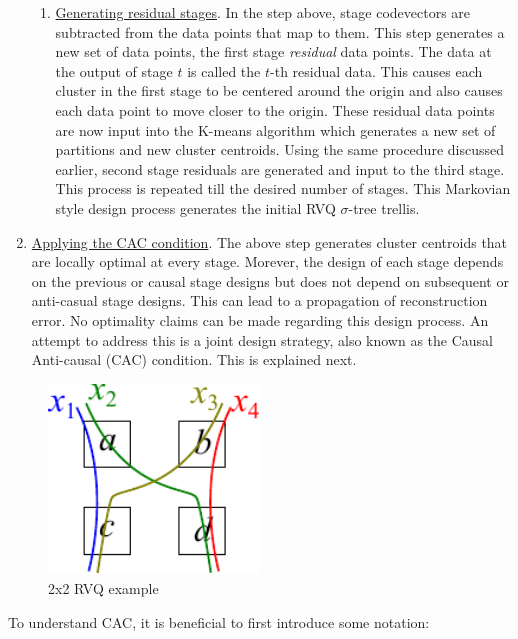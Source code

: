 \begin{enumerate}
\begin{enumerate}
\item \underline{Generating residual stages}.  In the step above, stage codevectors are subtracted from the data points that map to them.  This step generates a new set of data points, the first stage \emph{residual} data points.  The data at the output of stage $t$ is called the $t$-th residual data.  This causes each cluster in the first stage to be centered around the origin and also causes each data point to move closer to the origin.  These residual data points are now input into the K-means algorithm which generates a new set of partitions and new cluster centroids.  Using the same procedure discussed earlier, second stage residuals are generated and input to the third stage.  This process is repeated till the desired number of stages.  This Markovian style design process generates the initial RVQ $\sigma$-tree trellis.  
\end{enumerate}
\item \underline{Applying the CAC condition}.  The above step generates cluster centroids that are locally optimal at every stage.  Morever, the design of each stage depends on the previous or causal stage designs but does not depend on subsequent or anti-casual stage designs.   This can lead to a propagation of reconstruction error.  No optimality claims can be made regarding this design process.  An attempt to address this is a joint design strategy, also known as the Causal Anti-causal (CAC) condition.  This is explained next.
\end{enumerate}

\begin{figure}
\center
\includegraphics[width=0.5\textwidth]{thesis/RVQ_CAC_toyExample2_2x2.pdf}
\caption{2x2 RVQ example}
\label{fig:Figure1}
\end{figure}


To understand CAC, it is beneficial to first introduce some notation:

